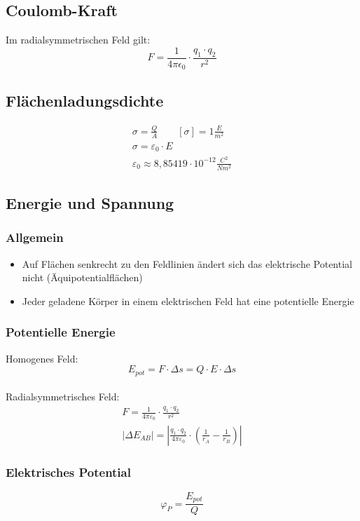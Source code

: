\documentclass[12pt,a4paper,titlepage]{article}
\begin{document}
		\subsection{Coulomb-Kraft}
			Im radialsymmetrischen Feld gilt:
			$$F = \frac{1}{4 \pi \epsilon_0} \cdot \frac{q_1 \cdot q_2}{r^2}$$
		\subsection{Flächenladungsdichte}
			\begin{gather*}
				\sigma = \frac{Q}{A} \qquad [\sigma] = 1 \frac{E}{m^2} \\
				\sigma = \varepsilon_0 \cdot E \\
				\varepsilon_0 \approx 8,85419 \cdot 10^{-12} \frac{C^2}{Nm^2}
			\end{gather*}
		\subsection{Energie und Spannung}
			\subsubsection{Allgemein}			
			\begin{itemize}
				\item Auf Flächen senkrecht zu den Feldlinien ändert sich das elektrische Potential nicht (Äquipotentialflächen)
				\item Jeder geladene Körper in einem elektrischen Feld hat eine potentielle Energie
			\end{itemize}
			\subsubsection{Potentielle Energie}
				Homogenes Feld: \\
				$$E_{pot} = F \cdot \Delta s = Q \cdot E \cdot \Delta s$$ \\
				Radialsymmetrisches Feld: \\
				\begin{gather*}
					F = \frac{1}{4\pi\varepsilon_0} \cdot \frac{q_1 \cdot q_2}{r^2} \\
					\left| \Delta E_{AB} \right| = \left| \frac{q_1 \cdot q_2}{4\pi\varepsilon_0} \cdot (\frac{1}{r_A}-\frac{1}{r_B}) \right|
				\end{gather*}
			\subsubsection{Elektrisches Potential}
				$$\varphi_P = \frac{E_{pot}}{Q}$$
\end{document}
